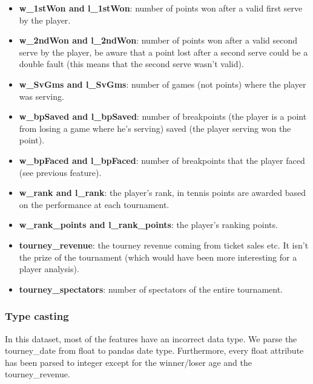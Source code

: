 \begin{itemize}
    \item \textbf{w\_1stWon and l\_1stWon}: number of points won after a valid first serve by the player.
    \item \textbf{w\_2ndWon and l\_2ndWon}: number of points won after a valid second serve by the player, be aware that a point lost after a second serve could be a double fault (this means that the second serve wasn't valid).
    \item \textbf{w\_SvGms and l\_SvGms}: number of games (not points) where the player was serving.
    \item \textbf{w\_bpSaved and l\_bpSaved}: number of breakpoints (the player is a point from losing a game where he's serving) saved (the player serving won the point).
    \item \textbf{w\_bpFaced and l\_bpFaced}: number of breakpoints that the player faced (see previous feature).
    \item \textbf{w\_rank and l\_rank}: the player's rank, in tennis points are awarded based on the performance at each tournament.
    \item \textbf{w\_rank\_points and l\_rank\_points}: the player's ranking points.
    \item \textbf{tourney\_revenue}: the tourney revenue coming from ticket sales etc. It isn't the prize of the tournament (which would have been more interesting for a player analysis).
    \item \textbf{tourney\_spectators}: number of spectators of the entire tournament.
\end{itemize}

\subsubsection{Type casting}
In this dataset, most of the features have an incorrect data type. We parse the tourney\_date from float to pandas date type. Furthermore, every float attribute has been parsed to integer except for the winner/loser age and the tourney\_revenue.

